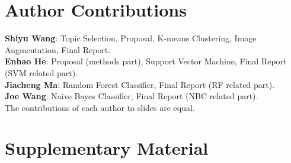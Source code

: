 \documentclass[final]{article}
\begin{document}
\section{Author Contributions}
\textbf{Shiyu Wang}: Topic Selection, Proposal, K-means Clustering, Image Augmentation, Final Report. \\
\textbf{Enhao He}: Proposal (methods part), Support Vector Machine, Final Report (SVM related part). \\
\textbf{Jiacheng Ma}: Random Forest Classifier, Final Report (RF related part). \\
\textbf{Joe Wang}: Naive Bayes Classifier, Final Report (NBC related part). \\
The contributions of each author to slides are equal. 
\newpage


\section{Supplementary Material}
\setcounter{figure}{0}
\renewcommand{\thefigure}{S\arabic{figure}}
\end{document}
